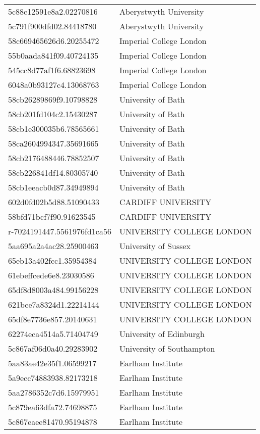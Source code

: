 \begin{tabular}{ll}
5c88c12591e8a2.02270816 & Aberystwyth University \\
5c791f900dfd02.84418780 & Aberystwyth University \\
58c669465626d6.20255472 & Imperial College London \\
55b0aada841f09.40724135 & Imperial College London \\
545cc8d77af1f6.68823698 & Imperial College London \\
6048a0b93127c4.13068763 & Imperial College London \\
58cb26289869f9.10798828 & University of Bath \\
58cb201fd104c2.15430287 & University of Bath \\
58cb1e300035b6.78565661 & University of Bath \\
58ca2604994347.35691665 & University of Bath \\
58cb2176488446.78852507 & University of Bath \\
58cb226841df14.80305740 & University of Bath \\
58cb1eeacb0d87.34949894 & University of Bath \\
602d0fd02b5d88.51090433 & CARDIFF UNIVERSITY \\
58bfd71bcf7f90.91623545 & CARDIFF UNIVERSITY \\
r-7024191447.5561976fd1ca56 & UNIVERSITY COLLEGE LONDON \\
5aa695a2a4ac28.25900463 & University of Sussex \\
65eb13a402fcc1.35954384 & UNIVERSITY COLLEGE LONDON \\
61ebeffcede6e8.23030586 & UNIVERSITY COLLEGE LONDON \\
65df8d8003a484.99156228 & UNIVERSITY COLLEGE LONDON \\
621bce7a8324d1.22214144 & UNIVERSITY COLLEGE LONDON \\
65df8e7736e857.20140631 & UNIVERSITY COLLEGE LONDON \\
62274eca4514a5.71404749 & University of Edinburgh \\
5c867af06d0a40.29283902 & University of Southampton \\
5aa83ae42e35f1.06599217 & Earlham Institute \\
5a9ecc74883938.82173218 & Earlham Institute \\
5aa2786352c7d6.15979951 & Earlham Institute \\
5c879ea63dfa72.74698875 & Earlham Institute \\
5c867eaee81470.95194878 & Earlham Institute \\

\end{tabular}
